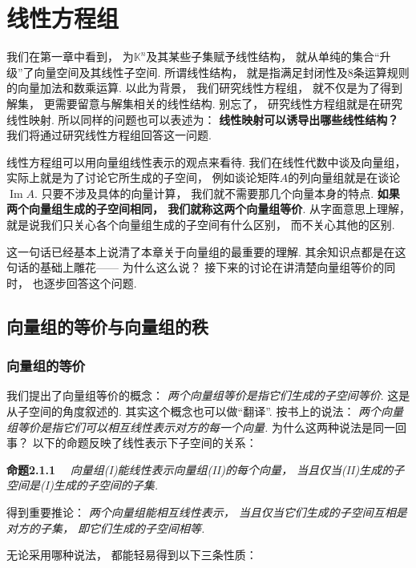 \clearpage

\section{线性方程组}

我们在第一章中看到，
为$\mathbb{K}^n$及其某些子集赋予线性结构，
就从单纯的集合“升级”了向量空间及其线性子空间.
所谓线性结构，
就是指满足封闭性及$8$条运算规则的向量加法和数乘运算.
以此为背景，
我们研究线性方程组，
就不仅是为了得到解集，
更需要留意与解集相关的线性结构.
别忘了，
研究线性方程组就是在研究线性映射.
所以同样的问题也可以表述为：
\textbf{线性映射可以诱导出哪些线性结构？}
我们将通过研究线性方程组回答这一问题.

线性方程组可以用向量组线性表示的观点来看待.
我们在线性代数中谈及向量组，
实际上就是为了讨论它所生成的子空间，
例如谈论矩阵$A$的列向量组就是在谈论$\operatorname{Im}A$.
只要不涉及具体的向量计算，
我们就不需要那几个向量本身的特点.
\textbf{如果两个向量组生成的子空间相同，
我们就称这两个向量组等价}.
从字面意思上理解，
就是说我们只关心各个向量组生成的子空间有什么区别，
而不关心其他的区别.

这一句话已经基本上说清了本章关于向量组的最重要的理解.
其余知识点都是在这句话的基础上雕花——
为什么这么说？
接下来的讨论在讲清楚向量组等价的同时，
也逐步回答这个问题.


\subsection{向量组的等价与向量组的秩}

\subsubsection{向量组的等价}

我们提出了向量组等价的概念：
\textit{两个向量组等价是指它们生成的子空间等价}.
这是从子空间的角度叙述的.
其实这个概念也可以做“翻译”.
按书上的说法：
\textit{两个向量组等价是指它们可以相互线性表示对方的每一个向量.}
为什么这两种说法是同一回事？
以下的命题反映了线性表示下子空间的关系：

\medskip
\textbf{命题2.1.1}~~
\textit{向量组(I)能线性表示向量组(II)的每个向量，
当且仅当(II)生成的子空间是(I)生成的子空间的子集.}
\medskip

得到重要推论：
\textit{两个向量组能相互线性表示，
当且仅当它们生成的子空间互相是对方的子集，
即它们生成的子空间相等.}
\medskip

无论采用哪种说法，
都能轻易得到以下三条性质：

\medskip

